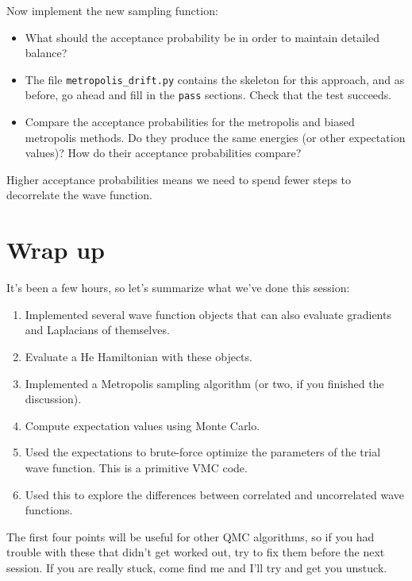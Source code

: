 \documentclass[12pt]{article}
\begin{document}
Now implement the new sampling function:
\begin{itemize}
  \item
    What should the acceptance probability be in order to maintain detailed balance?
  \item
    The file \verb|metropolis_drift.py| contains the skeleton for this approach, and as before, go ahead and fill in the \verb|pass| sections. Check that the test succeeds.
  \item
    Compare the acceptance probabilities for the metropolis and biased metropolis methods. 
    Do they produce the same energies (or other expectation values)? 
    How do their acceptance probabilities compare?
\end{itemize}

Higher acceptance probabilities means we need to spend fewer steps to decorrelate the wave function.

\section{Wrap up}

It's been a few hours, so let's summarize what we've done this session:
\begin{enumerate}
  \item
    Implemented several wave function objects that can also evaluate gradients and Laplacians of themselves.
  \item
    Evaluate a He Hamiltonian with these objects.
  \item
    Implemented a Metropolis sampling algorithm (or two, if you finished the discussion).
  \item
    Compute expectation values using Monte Carlo.
  \item
    Used the expectations to brute-force optimize the parameters of the trial wave function. 
    This is a primitive VMC code.
  \item
    Used this to explore the differences between correlated and uncorrelated wave functions.
\end{enumerate}
The first four points will be useful for other QMC algorithms, so if you had trouble with these that didn't get worked out, try to fix them before the next session.
If you are really stuck, come find me and I'll try and get you unstuck.
\end{document}
